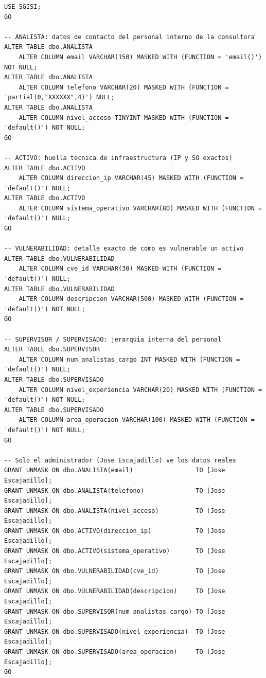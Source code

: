 \documentclass[11pt,a4paper]{article}
\begin{document}
\begin{lstlisting}
USE SGISI;
GO

-- ANALISTA: datos de contacto del personal interno de la consultora
ALTER TABLE dbo.ANALISTA
    ALTER COLUMN email VARCHAR(150) MASKED WITH (FUNCTION = 'email()') NOT NULL;
ALTER TABLE dbo.ANALISTA
    ALTER COLUMN telefono VARCHAR(20) MASKED WITH (FUNCTION = 'partial(0,"XXXXXX",4)') NULL;
ALTER TABLE dbo.ANALISTA
    ALTER COLUMN nivel_acceso TINYINT MASKED WITH (FUNCTION = 'default()') NOT NULL;
GO

-- ACTIVO: huella tecnica de infraestructura (IP y SO exactos)
ALTER TABLE dbo.ACTIVO
    ALTER COLUMN direccion_ip VARCHAR(45) MASKED WITH (FUNCTION = 'default()') NULL;
ALTER TABLE dbo.ACTIVO
    ALTER COLUMN sistema_operativo VARCHAR(80) MASKED WITH (FUNCTION = 'default()') NULL;
GO

-- VULNERABILIDAD: detalle exacto de como es vulnerable un activo
ALTER TABLE dbo.VULNERABILIDAD
    ALTER COLUMN cve_id VARCHAR(30) MASKED WITH (FUNCTION = 'default()') NULL;
ALTER TABLE dbo.VULNERABILIDAD
    ALTER COLUMN descripcion VARCHAR(500) MASKED WITH (FUNCTION = 'default()') NOT NULL;
GO

-- SUPERVISOR / SUPERVISADO: jerarquia interna del personal
ALTER TABLE dbo.SUPERVISOR
    ALTER COLUMN num_analistas_cargo INT MASKED WITH (FUNCTION = 'default()') NULL;
ALTER TABLE dbo.SUPERVISADO
    ALTER COLUMN nivel_experiencia VARCHAR(20) MASKED WITH (FUNCTION = 'default()') NOT NULL;
ALTER TABLE dbo.SUPERVISADO
    ALTER COLUMN area_operacion VARCHAR(100) MASKED WITH (FUNCTION = 'default()') NOT NULL;
GO

-- Solo el administrador (Jose Escajadillo) ve los datos reales
GRANT UNMASK ON dbo.ANALISTA(email)                 TO [Jose Escajadillo];
GRANT UNMASK ON dbo.ANALISTA(telefono)              TO [Jose Escajadillo];
GRANT UNMASK ON dbo.ANALISTA(nivel_acceso)          TO [Jose Escajadillo];
GRANT UNMASK ON dbo.ACTIVO(direccion_ip)            TO [Jose Escajadillo];
GRANT UNMASK ON dbo.ACTIVO(sistema_operativo)       TO [Jose Escajadillo];
GRANT UNMASK ON dbo.VULNERABILIDAD(cve_id)          TO [Jose Escajadillo];
GRANT UNMASK ON dbo.VULNERABILIDAD(descripcion)     TO [Jose Escajadillo];
GRANT UNMASK ON dbo.SUPERVISOR(num_analistas_cargo) TO [Jose Escajadillo];
GRANT UNMASK ON dbo.SUPERVISADO(nivel_experiencia)  TO [Jose Escajadillo];
GRANT UNMASK ON dbo.SUPERVISADO(area_operacion)     TO [Jose Escajadillo];
GO
\end{lstlisting}
\end{document}
